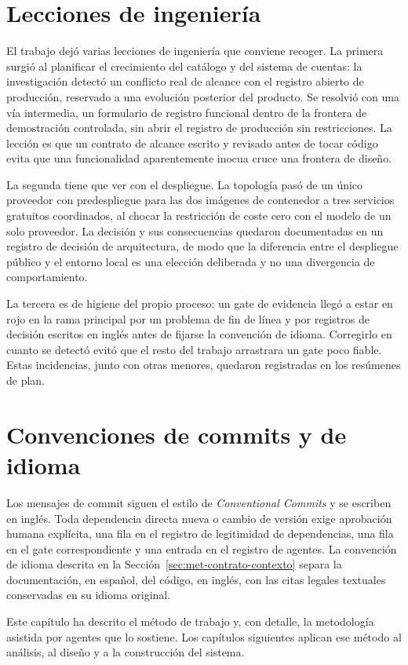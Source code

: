 \section{Lecciones de ingeniería}\label{sec:met-desviaciones}

El trabajo dejó varias lecciones de ingeniería que conviene recoger. La primera surgió al
planificar el crecimiento del catálogo y del sistema de cuentas: la investigación detectó un
conflicto real de alcance con el registro abierto de producción, reservado a una evolución
posterior del producto. Se resolvió con una vía intermedia, un formulario de registro
funcional dentro de la frontera de demostración controlada, sin abrir el registro de
producción sin restricciones. La lección es que un contrato de alcance escrito y revisado
antes de tocar código evita que una funcionalidad aparentemente inocua cruce una frontera de
diseño.

La segunda tiene que ver con el despliegue. La topología pasó de un único proveedor con
predespliegue para las dos imágenes de contenedor a tres servicios gratuitos coordinados, al
chocar la restricción de coste cero con el modelo de un solo proveedor. La decisión y sus
consecuencias quedaron documentadas en un registro de decisión de arquitectura, de modo que
la diferencia entre el despliegue público y el entorno local es una elección deliberada y
no una divergencia de comportamiento.

La tercera es de higiene del propio proceso: un gate de evidencia llegó a estar en rojo en la
rama principal por un problema de fin de línea y por registros de decisión escritos en inglés
antes de fijarse la convención de idioma. Corregirlo en cuanto se detectó evitó que el resto
del trabajo arrastrara un gate poco fiable. Estas incidencias, junto con otras menores,
quedaron registradas en los resúmenes de plan.

\section{Convenciones de commits y de idioma}\label{sec:met-convenciones}

Los mensajes de commit siguen el estilo de \textit{Conventional Commits} y se escriben en
inglés. Toda dependencia directa nueva o cambio de versión exige aprobación humana explícita,
una fila en el registro de legitimidad de dependencias, una fila en el gate correspondiente y
una entrada en el registro de agentes. La convención de idioma descrita en la
Sección~\ref{sec:met-contrato-contexto} separa la documentación, en español, del código, en
inglés, con las citas legales textuales conservadas en su idioma original.

Este capítulo ha descrito el método de trabajo y, con detalle, la metodología asistida por
agentes que lo sostiene. Los capítulos siguientes aplican ese método al análisis, al diseño y
a la construcción del sistema.
